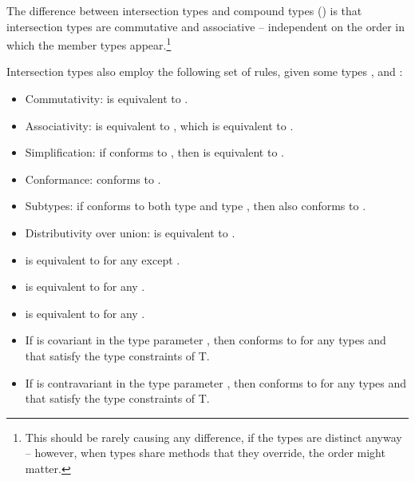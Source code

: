The difference between intersection types and compound types () is that intersection types are commutative and associative -- independent on the order in which the member types appear.\footnote{This should be rarely causing any difference, if the types are distinct anyway -- however, when types share methods that they override, the order might matter.}

Intersection types also employ the following set of rules, given some types ,  and :
\begin{itemize}
  \item Commutativity:  is equivalent to . 
  \item Associativity:  is equivalent to , which is equivalent to . 
  \item Simplification: if  conforms to , then  is equivalent to . 
  \item Conformance:  conforms to . 
  \item Subtypes: if  conforms to both type  and type , then  also conforms to . 
  \item Distributivity over union:  is equivalent to . 
  
  \item {} is equivalent to  for any  except . 
  \item {} is equivalent to  for any . 
  \item {} is equivalent to  for any . 
  
  \item If  is covariant in the type parameter , then  conforms to  for any types  and  that satisfy the type constraints of T. 
  \item If  is contravariant in the type parameter , then  conforms to  for any types  and  that satisfy the type constraints of T. 
\end{itemize}








